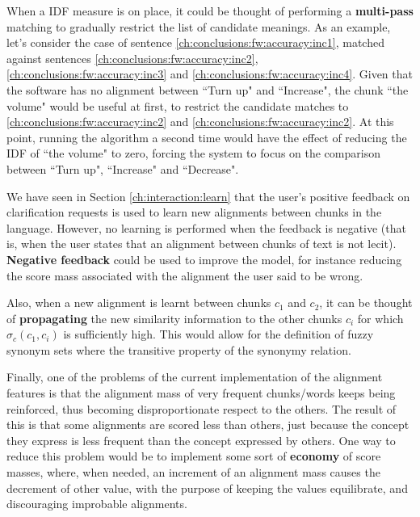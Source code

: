 When a IDF measure is on place, it could be thought of performing a \textbf{multi-pass} matching to gradually restrict the list of candidate meanings. As an example, let's consider the case of sentence \ref{ch:conclusions:fw:accuracy:inc1}, matched against sentences \ref{ch:conclusions:fw:accuracy:inc2}, \ref{ch:conclusions:fw:accuracy:inc3} and \ref{ch:conclusions:fw:accuracy:inc4}. Given that the software has no alignment between ``Turn up" and ``Increase", the chunk ``the volume" would be useful at first, to restrict the candidate matches to \ref{ch:conclusions:fw:accuracy:inc2} and \ref{ch:conclusions:fw:accuracy:inc2}. At this point, running the algorithm a second time would have the effect of reducing the IDF of ``the volume" to zero, forcing the system to focus on the comparison between ``Turn up", ``Increase" and ``Decrease".

 \label{ch:conclusions:fw:accuracy:inc1}
\vspace{-0.7cm}
 \label{ch:conclusions:fw:accuracy:inc2}
\vspace{-0.7cm}
 \label{ch:conclusions:fw:accuracy:inc3}
\vspace{-0.7cm}
 \label{ch:conclusions:fw:accuracy:inc4}


We have seen in Section \ref{ch:interaction:learn} that the user's positive feedback on clarification requests is used to learn new alignments between chunks in the language. However, no learning is performed when the feedback is negative (that is, when the user states that an alignment between chunks of text is not lecit). \textbf{Negative feedback} could be used to improve the model, for instance reducing the score mass associated with the alignment the user said to be wrong.

Also, when a new alignment is learnt between chunks $c_1$ and $c_2$, it can be thought of \textbf{propagating} the new similarity information to the other chunks $c_i$ for which $\sigma_{c}(c_1,c_i)$ is sufficiently high. This would allow for the definition of fuzzy synonym sets where the transitive property of the synonymy relation.

Finally, one of the problems of the current implementation of the alignment features is that the alignment mass of very frequent chunks/words keeps being reinforced, thus becoming disproportionate respect to the others. The result of this is that some alignments are scored less than others, just because the concept they express is less frequent than the concept expressed by others. One way to reduce this problem would be to implement some sort of \textbf{economy} of score masses, where, when needed, an increment of an alignment mass causes the decrement of other value, with the purpose of keeping the values equilibrate, and discouraging improbable alignments.

